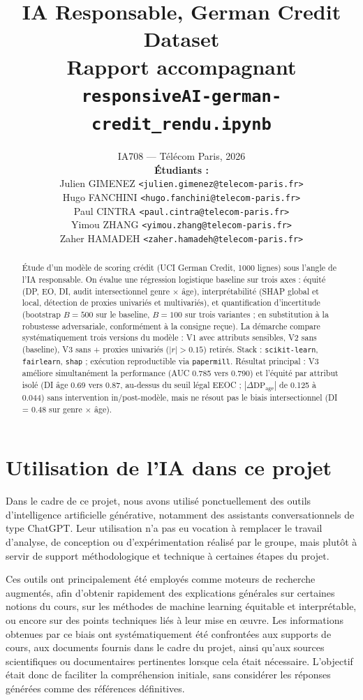 \documentclass[11pt, a4paper]{article}
\title{\textbf{IA Responsable, German Credit Dataset\\[0.3em]
\large Rapport accompagnant \texttt{responsiveAI-german-credit\_rendu.ipynb}}}
\author{%
IA708 --- Télécom Paris, 2026 \\[0.4em]
\normalsize \textbf{Étudiants :} \\
\normalsize Julien GIMENEZ \texttt{<julien.gimenez@telecom-paris.fr>} \\
\normalsize Hugo FANCHINI \texttt{<hugo.fanchini@telecom-paris.fr>} \\
\normalsize Paul CINTRA \texttt{<paul.cintra@telecom-paris.fr>} \\
\normalsize Yimou ZHANG \texttt{<yimou.zhang@telecom-paris.fr>} \\
\normalsize Zaher HAMADEH \texttt{<zaher.hamadeh@telecom-paris.fr>}
}
\date{}
\begin{document}
\maketitle
\vspace{-1em}

\begin{abstract}
\noindent Étude d'un modèle de scoring crédit (UCI German Credit, 1000 lignes) sous l'angle de l'IA responsable. On évalue une régression logistique baseline sur trois axes : équité (DP, EO, DI, audit intersectionnel genre $\times$ âge), interprétabilité (SHAP global et local, détection de proxies univariés et multivariés), et quantification d'incertitude (bootstrap $B = 500$ sur le baseline, $B = 100$ sur trois variantes ; en substitution à la robustesse adversariale, conformément à la consigne reçue). La démarche compare systématiquement trois versions du modèle : V1 avec attributs sensibles, V2 sans (baseline), V3 sans + proxies univariés ($|r| > 0.15$) retirés. Stack : \texttt{scikit-learn}, \texttt{fairlearn}, \texttt{shap} ; exécution reproductible via \texttt{papermill}. Résultat principal : V3 améliore simultanément la performance (AUC 0.785 vers 0.790) et l'équité par attribut isolé (DI âge 0.69 vers 0.87, au-dessus du seuil légal EEOC ; $|\Delta\text{DP}_{\text{age}}|$ de 0.125 à 0.044) sans intervention in/post-modèle, mais ne résout pas le biais intersectionnel (DI = 0.48 sur genre $\times$ âge).
\end{abstract}

\section*{Utilisation de l'IA dans ce projet}

Dans le cadre de ce projet, nous avons utilisé ponctuellement des outils d'intelligence artificielle générative, notamment des assistants conversationnels de type ChatGPT. Leur utilisation n'a pas eu vocation à remplacer le travail d'analyse, de conception ou d'expérimentation réalisé par le groupe, mais plutôt à servir de support méthodologique et technique à certaines étapes du projet.

Ces outils ont principalement été employés comme moteurs de recherche augmentés, afin d'obtenir rapidement des explications générales sur certaines notions du cours, sur les méthodes de machine learning équitable et interprétable, ou encore sur des points techniques liés à leur mise en \oe uvre. Les informations obtenues par ce biais ont systématiquement été confrontées aux supports de cours, aux documents fournis dans le cadre du projet, ainsi qu'aux sources scientifiques ou documentaires pertinentes lorsque cela était nécessaire. L'objectif était donc de faciliter la compréhension initiale, sans considérer les réponses générées comme des références définitives.
\end{document}
